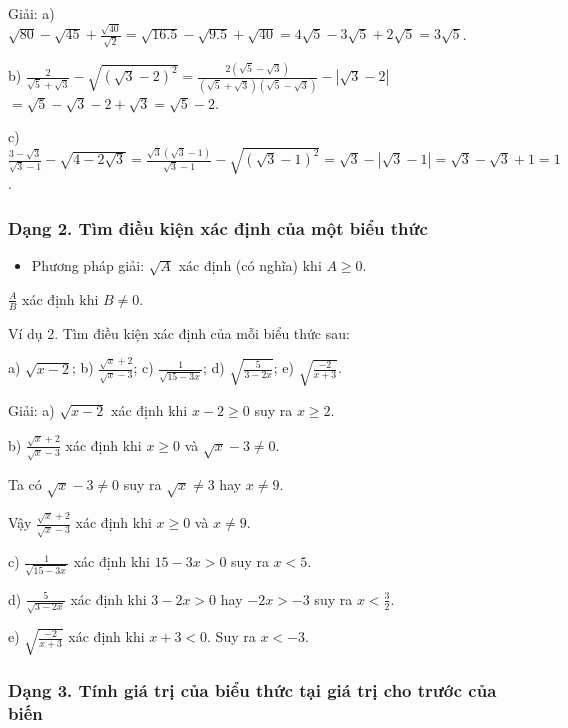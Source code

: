 \documentclass[%
    fontsize=12pt,%
    chapterprefix=false,%
    open=right,%
    twoside=false,%
    numbers=noenddot,%
    headings=optiontohead,%
    final,%
    DIV=15,%
    parskip=half %
]{scrbook}
\begin{document}
Giải: a) $ \sqrt{80} - \sqrt{45} + \frac{\sqrt{40}}{\sqrt{2}} = \sqrt{16.5} - \sqrt{9.5} + \sqrt{40} = 4\sqrt{5} - 3\sqrt{5} + 2\sqrt{5} = 3\sqrt{5} $.

b) $ \frac{2}{\sqrt{5} + \sqrt{3}} - \sqrt{(\sqrt{3} - 2)^2} = \frac{2(\sqrt{5} - \sqrt{3})}{(\sqrt{5} + \sqrt{3})(\sqrt{5} - \sqrt{3})} - |\sqrt{3} - 2| $    $ = \sqrt{5} - \sqrt{3} - 2 + \sqrt{3} = \sqrt{5} - 2 $.

c) $ \frac{3 - \sqrt{3}}{\sqrt{3} - 1} - \sqrt{4 - 2\sqrt{3}} = \frac{\sqrt{3}(\sqrt{3} - 1)}{\sqrt{3} - 1} - \sqrt{(\sqrt{3} - 1)^2} = \sqrt{3} - |\sqrt{3} - 1| = \sqrt{3} - \sqrt{3} + 1 = 1 $.
\subsubsection{Dạng 2. Tìm điều kiện xác định của một biểu thức}

\begin{itemize}
  \item Phương pháp giải: $ \sqrt{A} $ xác định (có nghĩa) khi $ A \geq 0 $.
\end{itemize}

$ \frac{A}{B} $ xác định khi $ B \neq 0 $.

Ví dụ 2. Tìm điều kiện xác định của mỗi biểu thức sau:

a) $ \sqrt{x - 2} $; b) $ \frac{\sqrt{x} + 2}{\sqrt{x} - 3} $; c) $ \frac{1}{\sqrt{15 - 3x}} $; d) $ \sqrt{\frac{5}{3 - 2x}} $; e) $ \sqrt{\frac{-2}{x + 3}} $.

Giải: a) $ \sqrt{x - 2} $ xác định khi $ x - 2 \geq 0 $ suy ra $ x \geq 2 $.

b) $ \frac{\sqrt{x} + 2}{\sqrt{x} - 3} $ xác định khi $ x \geq 0 $ và $ \sqrt{x} - 3 \neq 0 $.

Ta có $ \sqrt{x} - 3 \neq 0 $ suy ra $ \sqrt{x} \neq 3 $ hay $ x \neq 9 $.


Vậy $ \frac{\sqrt{x} + 2}{\sqrt{x} - 3} $ xác định khi $ x \geq 0 $ và $ x \neq 9 $.

c) $ \frac{1}{\sqrt{15 - 3x}} $ xác định khi $ 15 - 3x > 0 $ suy ra $ x < 5 $.

d) $ \frac{5}{\sqrt{3 - 2x}} $ xác định khi $ 3 - 2x > 0 $ hay $ -2x > -3 $ suy ra $ x < \frac{3}{2} $.

e) $ \sqrt{\frac{-2}{x + 3}} $ xác định khi $ x + 3 < 0 $. Suy ra $ x < -3 $.
\subsubsection{Dạng 3. Tính giá trị của biểu thức tại giá trị cho trước của biến}
\end{document}
